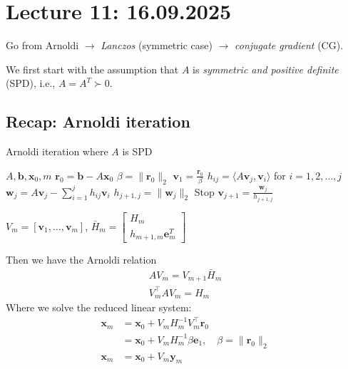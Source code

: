 \section{Lecture 11: 16.09.2025}

Go from Arnoldi $\to$ \emph{Lanczos} (symmetric case) $\to$ \emph{conjugate gradient} (CG).

We first start with the assumption that $A$ is \emph{symmetric and positive definite} (SPD), i.e., $A = A^T \succ 0$.

\subsection{Recap: Arnoldi iteration}

\begin{algorithm}[H]
    \caption{Arnoldi iteration where $A$ is SPD}
    \begin{algorithmic}[0]
        \Require $A, \mathbf{b}, \mathbf{x}_0, m$
        \State $\mathbf{r}_0 = \mathbf{b} - A\mathbf{x}_0$
        \State $\beta = \|\mathbf{r}_0\|_2$
        \State $\mathbf{v}_1 = \frac{\mathbf{r}_0}{\beta}$
        \State $h_{ij} = \langle A\mathbf{v}_j, \mathbf{v}_i \rangle$ for $i = 1, 2, \ldots, j$
        \State $\mathbf{w}_j = A\mathbf{v}_j - \sum_{i=1}^j h_{ij}\mathbf{v}_i$
        \State $h_{j+1,j} = \|\mathbf{w}_j\|_2$
        \State Stop
        \EndIf
        \State $\mathbf{v}_{j+1} = \frac{\mathbf{w}_j}{h_{j+1,j}}$
        \EndFor

        \Return $V_m = [\mathbf{v}_1, \ldots, \mathbf{v}_m]$, $\bar{H}_m =
            \begin{bmatrix}
                H_m \\
                h_{m+1,m}\mathbf{e}_m^T
            \end{bmatrix}$
    \end{algorithmic}
\end{algorithm}

Then we have the Arnoldi relation
\begin{align*}
    AV_m = V_{m+1}\bar{H}_m \\
    V_m^\top AV_m = H_m
\end{align*}
Where we solve the reduced linear system:
\begin{align*}
    \mathbf{x}_m & = \mathbf{x}_0 + V_m H_m^{-1} V_m^\top \mathbf{r}_0                                \\
                 & = \mathbf{x}_0 + V_m H_m^{-1} \beta \mathbf{e}_1, \quad \beta = \|\mathbf{r}_0\|_2 \\
    \mathbf{x}_m & = \mathbf{x}_0 + V_m \mathbf{y}_m
\end{align*}

